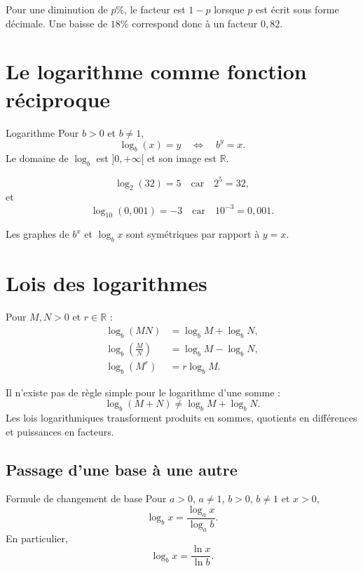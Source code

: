 \documentclass[12pt,a4paper,openany]{book}
\newcommand{\R}{\mathbb{R}}
\begin{document}
Pour une diminution de $p\%$, le facteur est $1-p$ lorsque $p$ est écrit sous forme décimale. Une baisse de $18\%$ correspond donc à un facteur $0{,}82$.

\section{Le logarithme comme fonction réciproque}

\begin{definition}{Logarithme}{}
Pour $b>0$ et $b\neq1$,
\[
\log_b(x)=y
\quad\Longleftrightarrow\quad
b^y=x.
\]
Le domaine de $\log_b$ est $]0,+\infty[$ et son image est $\R$.
\end{definition}

\begin{examplebox}
\[
\log_2(32)=5
\quad\text{car}\quad
2^5=32,
\]
et
\[
\log_{10}(0{,}001)=-3
\quad\text{car}\quad
10^{-3}=0{,}001.
\]
\end{examplebox}

Les graphes de $b^x$ et $\log_b x$ sont symétriques par rapport à $y=x$.

\section{Lois des logarithmes}

Pour $M,N>0$ et $r\in\R$ :
\begin{align*}
\log_b(MN)&=\log_bM+\log_bN,\\
\log_b\left(\frac MN\right)&=\log_bM-\log_bN,\\
\log_b(M^r)&=r\log_bM.
\end{align*}

\begin{warningbox}
Il n'existe pas de règle simple pour le logarithme d'une somme :
\[
\log_b(M+N)\neq\log_bM+\log_bN.
\]
Les lois logarithmiques transforment produits en sommes, quotients en différences et puissances en facteurs.
\end{warningbox}

\subsection{Passage d'une base à une autre}

\begin{theorem}{Formule de changement de base}{}
Pour $a>0$, $a\neq1$, $b>0$, $b\neq1$ et $x>0$,
\[
\log_b x=\frac{\log_a x}{\log_a b}.
\]
En particulier,
\[
\log_bx=\frac{\ln x}{\ln b}.
\]
\end{theorem}
\end{document}
